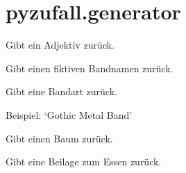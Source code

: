\documentclass[a4paper,12pt,oneside]{sphinxmanual}
\begin{document}
\section{pyzufall.generator}
\label{module:pyzufall-generator}\label{module:module-pyzufall.generator}

\begin{fulllineitems}
\label{module:pyzufall.generator.adjektiv}
Gibt ein Adjektiv zurück.

\end{fulllineitems}


\begin{fulllineitems}
\label{module:pyzufall.generator.band}
Gibt einen fiktiven Bandnamen zurück.

\end{fulllineitems}


\begin{fulllineitems}
\label{module:pyzufall.generator.bandart}
Gibt eine Bandart zurück.

Beispiel: `Gothic Metal Band'

\end{fulllineitems}


\begin{fulllineitems}
\label{module:pyzufall.generator.baum}
Gibt einen Baum zurück.

\end{fulllineitems}


\begin{fulllineitems}
\label{module:pyzufall.generator.beilage}
Gibt eine Beilage zum Essen zurück.

\end{fulllineitems}

\end{document}
